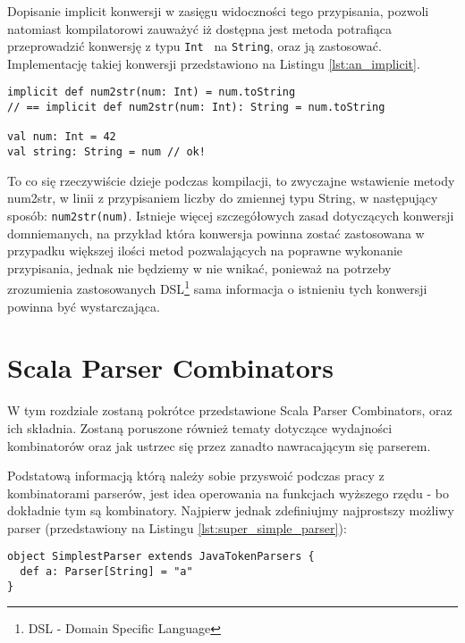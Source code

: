 Dopisanie implicit konwersji w zasięgu widoczności tego przypisania, pozwoli natomiast kompilatorowi zauważyć iż dostępna jest metoda potrafiąca przeprowadzić
konwersję z typu \verb|Int | na \verb|String|, oraz ją zastosować. Implementację takiej konwersji przedstawiono na Listingu \ref{lst:an_implicit}.

\begin{lstlisting}[caption={Implementacja oraz zastosowanie konwersji domniemanej --- \textit{Implicit Conversion}}, label={lst:an_implicit}]
implicit def num2str(num: Int) = num.toString
// == implicit def num2str(num: Int): String = num.toString

val num: Int = 42
val string: String = num // ok!
\end{lstlisting}

To co się rzeczywiście dzieje podczas kompilacji, to zwyczajne wstawienie metody num2str, w linii z przypisaniem liczby do zmiennej typu String,
w następujący sposób: \verb|num2str(num)|. Istnieje więcej szczegółowych zasad dotyczących konwersji domniemanych, na przykład która konwersja powinna zostać 
zastosowana w przypadku większej ilości metod pozwalających na poprawne wykonanie przypisania, jednak nie będziemy w nie wnikać, ponieważ na potrzeby zrozumienia
zastosowanych DSL\footnote{DSL - Domain Specific Language} sama informacja o istnieniu tych konwersji powinna być wystarczająca.




\section{Scala Parser Combinators}
\label{sec:scala_parser_combinators}
W tym rozdziale zostaną pokrótce przedstawione Scala Parser Combinators, oraz ich składnia.
Zostaną poruszone również tematy dotyczące wydajności kombinatorów oraz jak ustrzec się przez zanadto nawracającym się parserem.

Podstatową informacją którą należy sobie przyswoić podczas pracy z kombinatorami parserów, jest idea operowania na funkcjach wyższego rzędu - 
bo dokładnie tym są kombinatory. Najpierw jednak zdefiniujmy najprostszy możliwy parser (przedstawiony na Listingu \ref{lst:super_simple_parser}):

\begin{lstlisting}[caption={Najprostszy możliwy parser}, label={lst:super_simple_parser}]
object SimplestParser extends JavaTokenParsers {
  def a: Parser[String] = "a"
}
\end{lstlisting}

